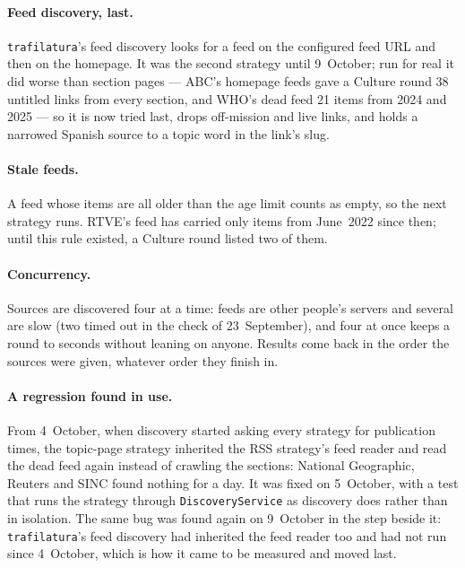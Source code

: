 \paragraph{Feed discovery, last.} \texttt{trafilatura}'s feed discovery
looks for a feed on the configured feed URL and then on the homepage. It
was the second strategy until 9~October; run for real it did worse than
section pages --- ABC's homepage feeds gave a Culture round 38 untitled
links from every section, and WHO's dead feed 21 items from 2024 and
2025 --- so it is now tried last, drops off-mission and live links, and
holds a narrowed Spanish source to a topic word in the link's slug.

\paragraph{Stale feeds.} A feed whose items are all older than the
age limit counts as empty, so the next strategy runs. RTVE's feed has
carried only items from June~2022 since then; until this rule existed,
a Culture round listed two of them.

\paragraph{Concurrency.} Sources are discovered four at a time: feeds
are other people's servers and several are slow (two timed out in the
check of 23~September), and four at once keeps a round to seconds
without leaning on anyone. Results come back in the order the sources
were given, whatever order they finish in.

\paragraph{A regression found in use.} From 4~October, when discovery
started asking every strategy for publication times, the
topic-page strategy inherited the RSS strategy's feed reader and read
the dead feed again instead of crawling the sections: National
Geographic, Reuters and SINC found nothing for a day. It was fixed on
5~October, with a test that runs the strategy through
\texttt{DiscoveryService} as discovery does rather than in isolation.
The same bug was found again on 9~October in the step beside it:
\texttt{trafilatura}'s feed discovery had inherited the feed reader too
and had not run since 4~October, which is how it came to be measured
and moved last.
